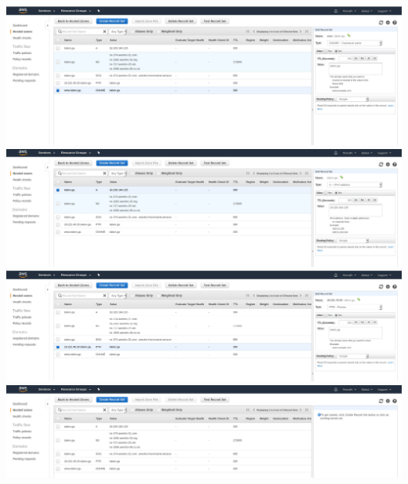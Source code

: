 \documentclass[9pt]{article}
\begin{document}
\includegraphics[width=\textwidth]{CNAME}
\includegraphics[width=\textwidth]{A}
\includegraphics[width=\textwidth]{PTR}
\includegraphics[width=\textwidth]{record_set}
\end{document}
